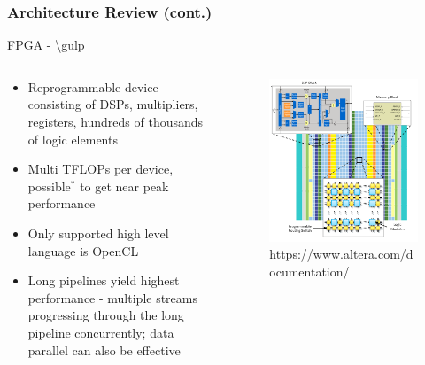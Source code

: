 \documentclass{beamer}
\begin{document}
\begin{frame}
  \frametitle{Architecture Review (cont.)}
  FPGA - \textbackslash gulp
  \begin{columns}
    \begin{column}{0.5\textwidth}
      \begin{itemize}
        \item Reprogrammable device consisting of DSPs, multipliers, registers, hundreds of
          thousands of logic elements
        \item Multi TFLOPs per device, possible$^{*}$ to get near peak performance
        \item Only supported high level language is OpenCL
        \item Long pipelines yield highest performance - multiple streams
          progressing through the long pipeline concurrently; data parallel can
          also be effective
      \end{itemize}
    \end{column}
    \begin{column}{0.5\textwidth}
      \begin{figure}
        \centering
        \includegraphics[width=\textwidth]{figures/fpga.png}
        {\tiny https://www.altera.com/documentation/}
      \end{figure}  
    \end{column}
  \end{columns}
\end{frame}
\end{document}
